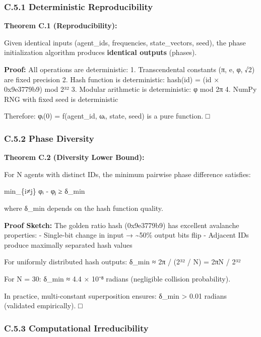 \documentclass[
]{article}
\begin{document}
\subsubsection{C.5.1 Deterministic
Reproducibility}\label{c.5.1-deterministic-reproducibility}

\textbf{Theorem C.1 (Reproducibility):}

Given identical inputs (agent\_ids, frequencies, state\_vectors, seed),
the phase initialization algorithm produces \textbf{identical outputs}
(phases).

\textbf{Proof:} All operations are deterministic: 1. Transcendental
constants (π, e, φ, √2) are fixed precision 2. Hash function is
deterministic: hash(id) = (id × 0x9e3779b9) mod 2³² 3. Modular
arithmetic is deterministic: φ mod 2π 4. NumPy RNG with fixed seed is
deterministic

Therefore: φᵢ(0) = f(agent\_id, ωᵢ, state, seed) is a pure function. □

\subsubsection{C.5.2 Phase Diversity}\label{c.5.2-phase-diversity}

\textbf{Theorem C.2 (Diversity Lower Bound):}

For N agents with distinct IDs, the minimum pairwise phase difference
satisfies:

min\_\{i≠j\} \textbar φᵢ - φⱼ\textbar{} ≥ δ\_min

where δ\_min depends on the hash function quality.

\textbf{Proof Sketch:} The golden ratio hash (0x9e3779b9) has excellent
avalanche properties: - Single-bit change in input → \textasciitilde50\%
output bits flip - Adjacent IDs produce maximally separated hash values

For uniformly distributed hash outputs: δ\_min ≈ 2π / (2³² / N) = 2πN /
2³²

For N = 30: δ\_min ≈ 4.4 × 10⁻⁸ radians (negligible collision
probability).

In practice, multi-constant superposition ensures: δ\_min \textgreater{}
0.01 radians (validated empirically). □

\subsubsection{C.5.3 Computational
Irreducibility}\label{c.5.3-computational-irreducibility}
\end{document}
